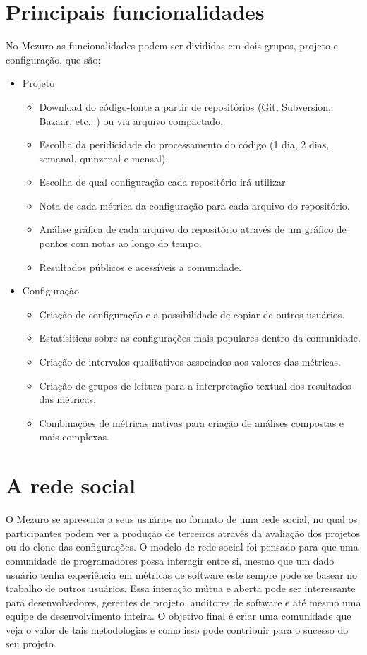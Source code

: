\documentclass[12pt]{article}
\begin{document}
\section{Principais funcionalidades}\label{sec:princ-funcionalidades}
No Mezuro as funcionalidades podem ser divididas em dois grupos, projeto e configuração, que são:

\begin{itemize}
  \item Projeto
    \begin{itemize}
    \item Download do código-fonte a partir de repositórios (Git, Subversion, Bazaar, etc...) ou via arquivo compactado.
        \item Escolha da peridicidade do processamento do código (1 dia, 2 dias, semanal, quinzenal e mensal).
        \item Escolha de qual configuração cada repositório irá utilizar.
        \item Nota de cada métrica da configuração para cada arquivo do repositório.
        \item Análise gráfica de cada arquivo do repositório através de um gráfico de pontos com notas ao longo do tempo.
        \item Resultados públicos e acessíveis a comunidade.
    \end{itemize}
    \item Configuração
    \begin{itemize}
    \item Criação de configuração e a possibilidade de copiar de outros usuários.
        \item Estatísiticas sobre as configurações mais populares dentro da comunidade.
        \item Criação de intervalos qualitativos associados aos valores das métricas.
        \item Criação de grupos de leitura para a interpretação textual dos resultados das métricas.
        \item Combinações de métricas nativas para criação de análises compostas e mais complexas.
    \end{itemize}
\end{itemize}

\section{A rede social}\label{sec:user-potencial}
O Mezuro se apresenta a seus usuários no formato de uma rede social, no qual os participantes podem ver a produção de terceiros através da avaliação dos projetos ou do clone das configurações. O modelo de rede social foi pensado para que uma comunidade de programadores possa interagir entre si, mesmo que um dado usuário tenha experiência em métricas de software este sempre pode se basear no trabalho de outros usuários. Essa interação mútua e aberta pode ser interessante para desenvolvedores, gerentes de projeto, auditores de software e até mesmo uma equipe de desenvolvimento inteira. O objetivo final é criar uma comunidade que veja o valor de tais metodologias e como isso pode contribuir para o sucesso do seu projeto.



\end{document}
